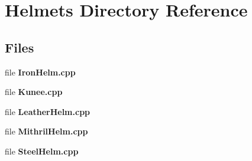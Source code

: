 \section{Helmets Directory Reference}
\label{dir_662f327ecbb4daec28de346c700f67dd}
\subsection*{Files}
\begin{DoxyCompactItemize}
\item 
file {\bf Iron\-Helm.\-cpp}
\item 
file {\bf Kunee.\-cpp}
\item 
file {\bf Leather\-Helm.\-cpp}
\item 
file {\bf Mithril\-Helm.\-cpp}
\item 
file {\bf Steel\-Helm.\-cpp}
\end{DoxyCompactItemize}
